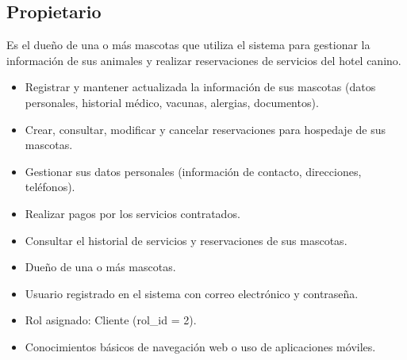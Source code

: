 \begin{Usuario}{\hypertarget{Propietario}{\subsection{Propietario}}}{
	Es el dueño de una o más mascotas que utiliza el sistema para gestionar la información de sus animales y realizar reservaciones de servicios del hotel canino.
}
    \item[Responsabilidades:] \cdtEmpty
    \begin{itemize}
		\item Registrar y mantener actualizada la información de sus mascotas (datos personales, historial médico, vacunas, alergias, documentos).
		\item Crear, consultar, modificar y cancelar reservaciones para hospedaje de sus mascotas.
		\item Gestionar sus datos personales (información de contacto, direcciones, teléfonos).
		\item Realizar pagos por los servicios contratados.
		\item Consultar el historial de servicios y reservaciones de sus mascotas.
    \end{itemize}

	\item[Perfil:] \cdtEmpty
    \begin{itemize}
		\item Dueño de una o más mascotas.
		\item Usuario registrado en el sistema con correo electrónico y contraseña.
		\item Rol asignado: Cliente (rol\_id = 2).
		\item Conocimientos básicos de navegación web o uso de aplicaciones móviles.
    \end{itemize}
\end{Usuario}

